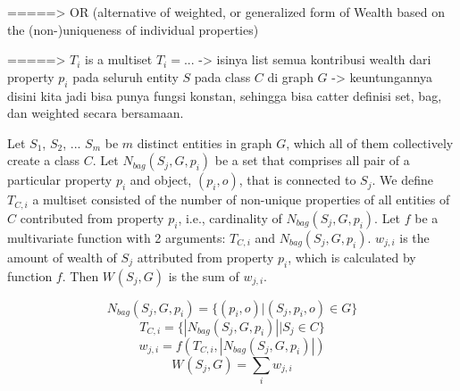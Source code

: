 =====> OR (alternative of weighted, or generalized form of Wealth based on the (non-)uniqueness of individual properties)

=====> \(T_i\) is a multiset \(T_i = ... \) -> isinya list semua kontribusi wealth dari property \(p_i\) pada seluruh entity \(S\) pada class \(C\) di graph \(G\) -> keuntungannya disini kita jadi bisa punya fungsi konstan, sehingga bisa catter definisi set, bag, dan weighted secara bersamaan.

Let \(S_1\), \(S_2\), ... \(S_m\) be \(m\) distinct entities in graph \(G\), which all of them collectively create a class \(C\). Let \(N_{bag}(S_j,G,p_i)\) be a set that comprises all pair of a particular property \(p_i\) and object, \((p_i,o)\), that is connected to \(S_j\). We define \(T_{C,i}\) a multiset consisted of the number of non-unique properties of all entities of \(C\) contributed from property \(p_i\), i.e., cardinality of \(N_{bag}(S_j,G,p_i)\). Let \(f\) be a multivariate function with 2 arguments: \(T_{C,i}\) and \(N_{bag}(S_j,G,p_i)\). \(w_{j,i}\) is the amount of wealth of \(S_j\) attributed from property \(p_i\), which is calculated by function \(f\). Then \(W_{}(S_j, G)\) is the sum of \(w_{j,i}\).


\[
    N_{bag}(S_j,G,p_i) = \{(p_i,o) | (S_j, p_i, o) \in G\}
\]
\[
    T_{C,i} = \{|N_{bag}(S_j,G,p_i)| | S_j \in C\}
\]
\[
    w_{j,i} = f(T_{C,i}, |N_{bag}(S_j,G,p_i)|)
\]
\[
    W_{}(S_j, G) = \sum_i w_{j,i}
\]